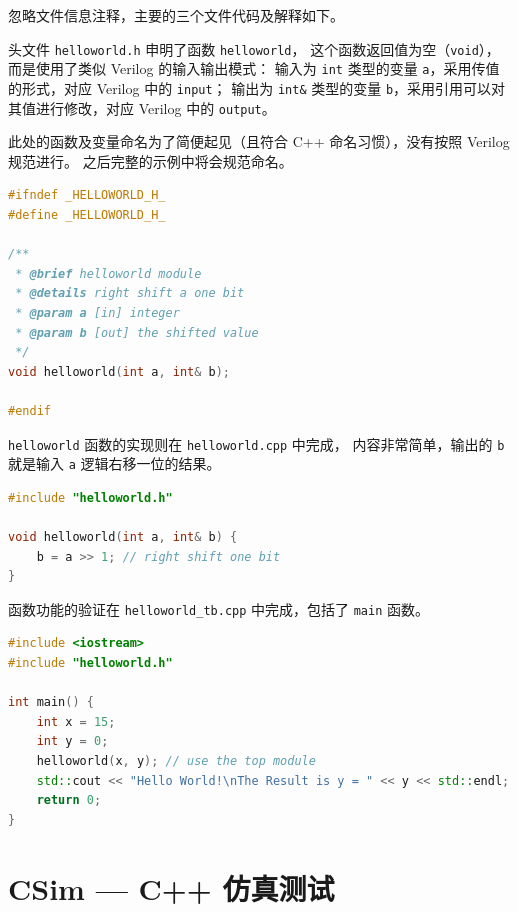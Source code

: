 \documentclass[English,Chinese,French,JP,TC,use boldface,simple name]{beaulivre}
\begin{document}
    忽略文件信息注释，主要的三个文件代码及解释如下。

    头文件 \texttt{helloworld.h} 申明了函数 \texttt{helloworld}，
    这个函数返回值为空（\texttt{void}），
    而是使用了类似 Verilog 的输入输出模式：
    输入为 \texttt{int} 类型的变量 \texttt{a}，采用传值的形式，对应 Verilog 中的 \texttt{input}；
    输出为 \texttt{int\&} 类型的变量 \texttt{b}，采用引用可以对其值进行修改，对应 Verilog 中的 \texttt{output}。
    \begin{warning}
      此处的函数及变量命名为了简便起见（且符合 C++ 命名习惯），没有按照 Verilog 规范进行。
      之后完整的示例中将会规范命名。
    \end{warning}
    \begin{lstlisting}[language=C++, title={helloworld.h}]
#ifndef _HELLOWORLD_H_
#define _HELLOWORLD_H_

/**
 * @brief helloworld module
 * @details right shift a one bit
 * @param a [in] integer
 * @param b [out] the shifted value
 */
void helloworld(int a, int& b);

#endif
    \end{lstlisting}
    
    \texttt{helloworld} 函数的实现则在 \texttt{helloworld.cpp} 中完成，
    内容非常简单，输出的 \texttt{b} 就是输入 \texttt{a} 逻辑右移一位的结果。
    \begin{lstlisting}[language=C++, title={helloworld.cpp}]
#include "helloworld.h"

void helloworld(int a, int& b) {
    b = a >> 1; // right shift one bit
}
    \end{lstlisting}

    函数功能的验证在 \texttt{helloworld\_tb.cpp} 中完成，包括了 \texttt{main} 函数。
    \begin{lstlisting}[language=C++, title={helloworld\_tb.cpp},morekeywords={std,cout,endl}]
#include <iostream>
#include "helloworld.h"

int main() {
    int x = 15;
    int y = 0;
    helloworld(x, y); // use the top module
    std::cout << "Hello World!\nThe Result is y = " << y << std::endl;
    return 0;
}
    \end{lstlisting}

  \section{CSim --- C++ 仿真测试}
\end{document}
